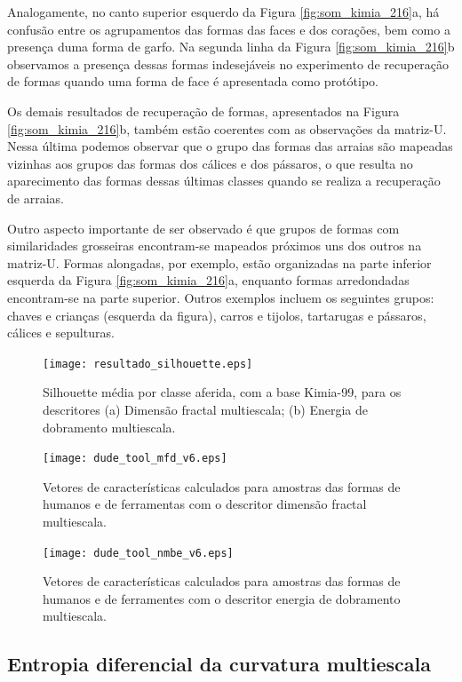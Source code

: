 Analogamente, no canto superior esquerdo da Figura \ref{fig:som_kimia_216}a, há confusão entre os agrupamentos das formas das faces e dos corações, bem como a presença duma forma de garfo. Na segunda linha da Figura \ref{fig:som_kimia_216}b observamos a presença dessas formas indesejáveis no experimento de recuperação de formas quando uma forma de face é apresentada como protótipo. 

Os demais resultados de recuperação de formas, apresentados na Figura \ref{fig:som_kimia_216}b, também estão coerentes com as observações da matriz-U. Nessa última podemos observar que o grupo das formas das arraias são mapeadas vizinhas aos grupos das formas dos cálices e dos pássaros, o que resulta no aparecimento das formas dessas últimas classes quando se realiza a recuperação de arraias. 

Outro aspecto importante de ser observado é que  grupos de formas com similaridades grosseiras encontram-se mapeados próximos uns dos outros na matriz-U. Formas alongadas, por exemplo, estão organizadas na parte inferior esquerda da Figura \ref{fig:som_kimia_216}a, enquanto formas arredondadas encontram-se na parte superior. Outros exemplos incluem os seguintes grupos: chaves e crianças (esquerda da figura), carros e tijolos, tartarugas e pássaros, cálices e sepulturas. 

\begin{figure}[h!]
  \caption{\label{fig:silhouette} Silhouette média por classe aferida, com a base Kimia-99, para os descritores (a) Dimensão fractal multiescala; (b) Energia de dobramento multiescala.}
  \centering
  \texttt{[image: resultado\_silhouette.eps]}
\end{figure}

\begin{figure}[h!]
  \caption{\label{fig:dude_tool_mfd}   Vetores de características calculados para amostras das formas de humanos e de ferramentas com o descritor dimensão fractal multiescala.}
  \centering
  \texttt{[image: dude\_tool\_mfd\_v6.eps]}
\end{figure}

\begin{figure}[h!]
  \caption{\label{fig:dude_tool_nmbe} Vetores de características calculados para amostras das formas de humanos e de ferramentes com o descritor energia de dobramento multiescala.}
  \centering
  \texttt{[image: dude\_tool\_nmbe\_v6.eps]}
\end{figure}

\subsection{Entropia diferencial da curvatura multiescala}


